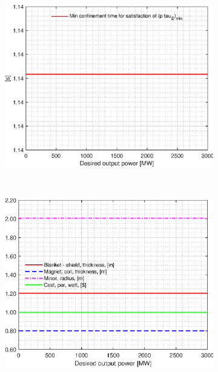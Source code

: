 \begin{figure}[H]
	\centering
	\begin{subfigure}[h!]{.45\textwidth}
		\includegraphics[width=\textwidth]{MatlabFigures/PE/f1.eps}
	\end{subfigure}
	~
	\begin{subfigure}[h!]{.45\textwidth}
		\includegraphics[width=\textwidth]{MatlabFigures/PE/f2.eps}
	\end{subfigure}


\end{figure}
